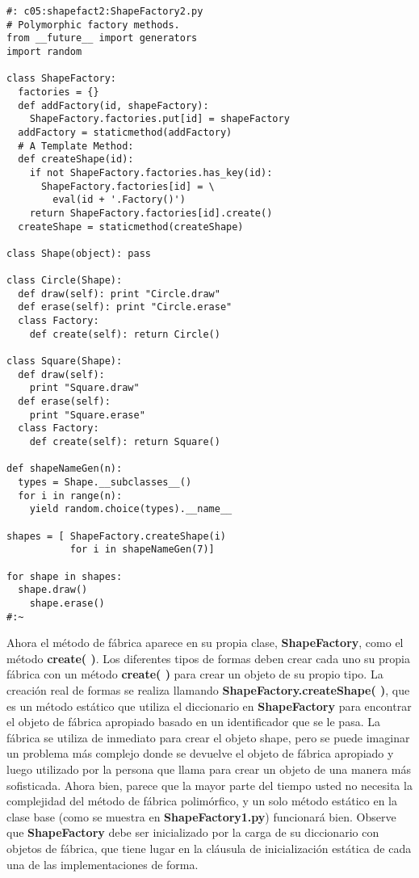 \begin{lstlisting} 
#: c05:shapefact2:ShapeFactory2.py 
# Polymorphic factory methods. 
from __future__ import generators 
import random 

class ShapeFactory: 
  factories = {} 
  def addFactory(id, shapeFactory): 
    ShapeFactory.factories.put[id] = shapeFactory 
  addFactory = staticmethod(addFactory) 
  # A Template Method: 
  def createShape(id): 
    if not ShapeFactory.factories.has_key(id): 
      ShapeFactory.factories[id] = \ 
        eval(id + '.Factory()') 
    return ShapeFactory.factories[id].create() 
  createShape = staticmethod(createShape) 
  
class Shape(object): pass 

class Circle(Shape): 
  def draw(self): print "Circle.draw"  
  def erase(self): print "Circle.erase" 
  class Factory: 
    def create(self): return Circle()  
    
class Square(Shape): 
  def draw(self):  
    print "Square.draw"  
  def erase(self):  
    print "Square.erase"  
  class Factory: 
    def create(self): return Square() 
    
def shapeNameGen(n): 
  types = Shape.__subclasses__() 
  for i in range(n): 
    yield random.choice(types).__name__ 
    
shapes = [ ShapeFactory.createShape(i)  
           for i in shapeNameGen(7)] 
           
for shape in shapes: 
  shape.draw() 
    shape.erase() 
#:~ 
\end{lstlisting}
Ahora el método de fábrica aparece en su propia clase, \textbf{ShapeFactory}, como el método \textbf{create( )}. Los diferentes tipos de formas deben crear cada uno su propia fábrica con un método \textbf{create( )} para crear un objeto de su propio tipo. La creación real de formas se realiza llamando \textbf{ShapeFactory.createShape( )}, que es un método estático que utiliza el diccionario en \textbf{ShapeFactory} para encontrar el objeto de fábrica apropiado basado en un identificador que se le pasa. La fábrica se utiliza de inmediato para crear el objeto shape, pero se puede imaginar un problema más complejo donde se devuelve el objeto de fábrica apropiado y luego utilizado por la persona que llama para crear un objeto de una manera más sofisticada. Ahora bien, parece que la mayor parte del tiempo usted no necesita la complejidad del método de fábrica polimórfico, y un solo método estático en la clase base (como se muestra en \textbf{ShapeFactory1.py}) funcionará bien. Observe que \textbf{ShapeFactory} debe ser inicializado por la carga de su diccionario con objetos de fábrica, que tiene lugar en la cláusula de inicialización estática de cada una de las implementaciones de forma.   \newline

